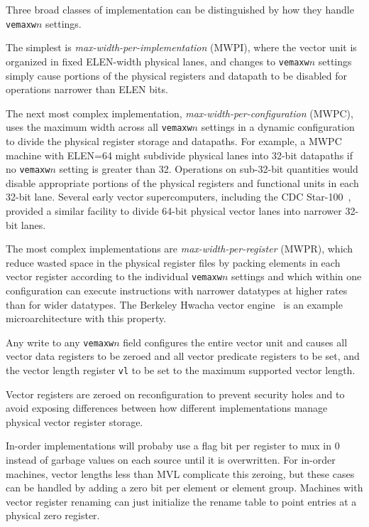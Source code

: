 \begin{commentary}
Three broad classes of implementation can be distinguished by how they
handle {\tt vemaxw}$n$ settings.

The simplest is {\em max-width-per-implementation} (MWPI), where the
vector unit is organized in fixed ELEN-width physical lanes, and
changes to {\tt vemaxw}$n$ settings simply cause portions of the
physical registers and datapath to be disabled for operations narrower
than ELEN bits.

The next most complex implementation, {\em
  max-width-per-configuration} (MWPC), uses the maximum width across
all {\tt vemaxw}$n$ settings in a dynamic configuration to divide the
physical register storage and datapaths.  For example, a MWPC machine
with ELEN=64 might subdivide physical lanes into 32-bit datapaths if
no {\tt vemaxw}$n$ setting is greater than 32.  Operations on
sub-32-bit quantities would disable appropriate portions of the
physical registers and functional units in each 32-bit lane.  Several
early vector supercomputers, including the CDC
Star-100~\cite{cdcstart100}, provided a similar facility to divide
64-bit physical vector lanes into narrower 32-bit lanes.

The most complex implementations are {\em max-width-per-register}
(MWPR), which reduce wasted space in the physical register files by
packing elements in each vector register according to the individual
{\tt vemaxw}$n$ settings and which within one configuration can
execute instructions with narrower datatypes at higher rates than for
wider datatypes.  The Berkeley Hwacha vector
engine~\cite{hwachatr,mixedprecision} is an example microarchitecture
with this property.
\end{commentary}

Any write to any {\tt vemaxw}$n$ field configures the entire vector
unit and causes all vector data registers to be zeroed and all vector
predicate registers to be set, and the vector length register {\tt vl}
to be set to the maximum supported vector length.

\begin{commentary}
  Vector registers are zeroed on reconfiguration to prevent security
  holes and to avoid exposing differences between how different
  implementations manage physical vector register storage.

  In-order implementations will probaby use a flag bit per register to
  mux in 0 instead of garbage values on each source until it is
  overwritten.  For in-order machines, vector lengths less than MVL
  complicate this zeroing, but these cases can be handled by adding a
  zero bit per element or element group.  Machines with vector
  register renaming can just initialize the rename table to point
  entries at a physical zero register.
\end{commentary}

